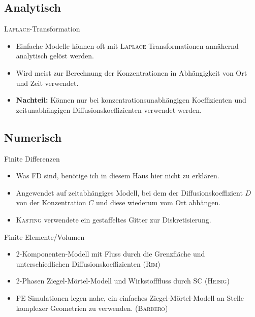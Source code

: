 \documentclass[utf8x,compress,professionalfonts]{beamer}
\begin{document}
\subsection{Analytisch}
\begin{frame}{\textsc{Laplace}-Transformation}
  \begin{itemize}
    \item Einfache Modelle k\"onnen oft mit \textsc{Laplace}-Transformationen
      ann\"ahernd analytisch gel\"ost werden.
      \bigskip
    \item Wird meist zur Berechnung der Konzentrationen in Abh\"angigkeit von Ort
      und Zeit verwendet.
      \bigskip
    \item<2-> \textbf{Nachteil:} K\"onnen nur bei konzentrationsunabh\"angigen Koeffizienten
      und zeitunabh\"angigen Diffusionskoeffizienten verwendet werden.
  \end{itemize}
\end{frame}

\subsection{Numerisch}
\begin{frame}{Finite Differenzen}
  \begin{itemize}
    \item Was FD sind, ben\"otige ich in diesem Haus hier nicht zu erkl\"aren.
      \bigskip
    \item Angewendet auf zeitabh\"angiges Modell, bei dem der Diffusionskoeffizient
      $D$ von der Konzentration $C$ und diese wiederum vom Ort abh\"angen.
      \bigskip
    \item<2-> \textsc{Kasting} verwendete ein gestaffeltes Gitter zur Diskretisierung.
  \end{itemize}
\end{frame}

\begin{frame}{Finite Elemente/Volumen}
  \begin{itemize}
    \item<1-> 2-Komponenten-Modell mit Fluss durch die Grenzfl\"ache und
      unterschiedlichen Diffusionskoeffizienten (\textsc{Rim})
      \bigskip
    \item<2-> 2-Phasen Ziegel-M\"ortel-Modell und Wirkstofffluss durch SC (\textsc{Heisig})
      \bigskip
    \item<3-> FE Simulationen legen nahe, ein einfaches Ziegel-M\"ortel-Modell an
      Stelle komplexer Geometrien zu verwenden. (\textsc{Barbero})
  \end{itemize}
\end{frame}
\end{document}
